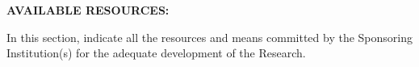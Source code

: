 \documentclass[MAIN.tex]{subfiles}
\begin{document}
\noindent\textbf{AVAILABLE RESOURCES:}

\medskip

\noindent In this section, indicate all the resources and means committed by the Sponsoring Institution(s) for the adequate development of the Research.

\bigskip



\end{document}

